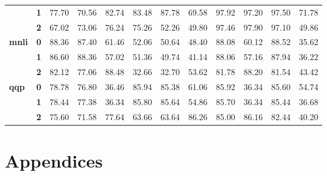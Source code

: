 \documentclass[11pt,a4paper]{article}
\begin{document}
\begin{table}[ht]
\begin{tabular}{llcccccccccc}
		& \textbf{1} & 77.70      & 70.56      & 82.74      & 83.48      & 87.78      & 69.58      & 97.92      & 97.20      & 97.50      & 71.78                           \\
		& \textbf{2} & 67.02      & 73.06      & 76.24      & 75.26      & 52.26      & 49.80      & 97.46      & 97.90      & 97.10      & 49.86                           \\
		\hline
		\multirow{3}{*}{\textbf{mnli}}          & \textbf{0} & 88.36      & 87.40      & 61.46      & 52.06      & 50.64      & 48.40      & 88.08      & 60.12      & 88.52      & 35.62                           \\
		& \textbf{1} & 86.60      & 88.36      & 57.02      & 51.36      & 49.74      & 41.14      & 88.06      & 57.16      & 87.94      & 36.22                           \\
		& \textbf{2} & 82.12      & 77.06      & 88.48      & 32.66      & 32.70      & 53.62      & 81.78      & 88.20      & 81.54      & 43.42                           \\
		\hline
		\multirow{3}{*}{\textbf{qqp}}           & \textbf{0} & 78.78      & 76.80      & 36.46      & 85.94      & 85.38      & 61.06      & 85.92      & 36.34      & 85.60      & 54.74                           \\
		& \textbf{1} & 78.44      & 77.38      & 36.34      & 85.80      & 85.64      & 54.86      & 85.70      & 36.34      & 85.44      & 36.68                           \\
		& \textbf{2} & 75.60      & 71.58      & 77.64      & 63.66      & 63.64      & 86.26      & 85.00      & 86.16      & 82.44      & 40.20                          \\
		\bottomrule
	\end{tabular}
\end{table}

\section{Appendices}
\label{sec:appendix}
\end{document}
